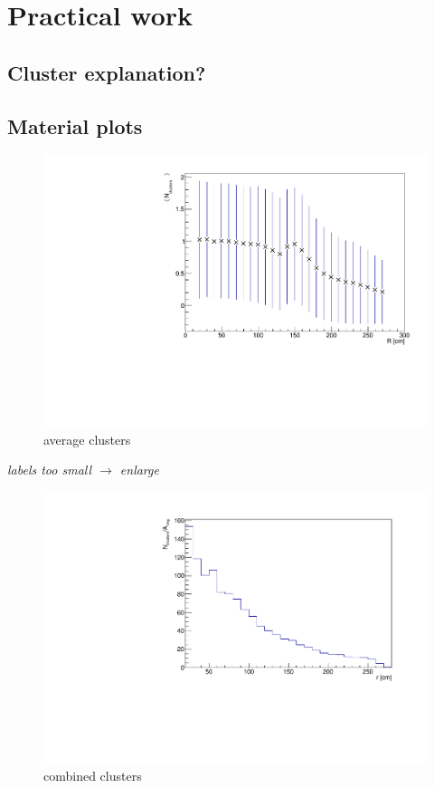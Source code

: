 \chapter{Practical work}\label{cha:work} %

\section{Cluster explanation?}
\section{Material plots}
\begin{figure}[H]
    \centering
    \includegraphics[width=.6\linewidth]{img/averageClusters.pdf}
    \caption{average clusters}
    \label{fig:work:average}
\end{figure}
\textit{labels too small $\rightarrow$ enlarge}
\begin{figure}[H]
    \centering
    \includegraphics[width=.6\linewidth]{img/combined_clusters_norot.pdf}
    \caption{combined clusters}
    \label{fig:work:combined}
\end{figure}


